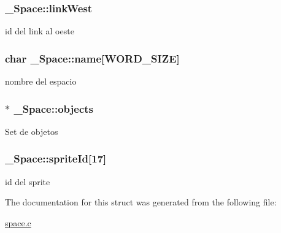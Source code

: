 \subsubsection[{\texorpdfstring{link\+West}{linkWest}}]{ \+\_\+\+Space\+::link\+West}\hypertarget{struct__Space_aaa6f5fa10a67afc466e3b272099dc398}{}\label{struct__Space_aaa6f5fa10a67afc466e3b272099dc398}
id del link al oeste 
\subsubsection[{\texorpdfstring{name}{name}}]{\setlength{\rightskip}{0pt plus 5cm}char \+\_\+\+Space\+::name\mbox{[}{\bf W\+O\+R\+D\+\_\+\+S\+I\+ZE}\mbox{]}}\hypertarget{struct__Space_a4e8775f2ba9ae19392f9942dbb5f5ec0}{}\label{struct__Space_a4e8775f2ba9ae19392f9942dbb5f5ec0}
nombre del espacio 
\subsubsection[{\texorpdfstring{objects}{objects}}]{$\ast$ \+\_\+\+Space\+::objects}\hypertarget{struct__Space_a661ed8b0fc8085b6db70188aa5085625}{}\label{struct__Space_a661ed8b0fc8085b6db70188aa5085625}
Set de objetos 
\subsubsection[{\texorpdfstring{sprite\+Id}{spriteId}}]{ \+\_\+\+Space\+::sprite\+Id\mbox{[}17\mbox{]}}\hypertarget{struct__Space_a5a86c929d4043837ee01ea1b14749970}{}\label{struct__Space_a5a86c929d4043837ee01ea1b14749970}
id del sprite 

The documentation for this struct was generated from the following file\+:\begin{DoxyCompactItemize}
\item 
\hyperlink{space_8c}{space.\+c}\end{DoxyCompactItemize}
